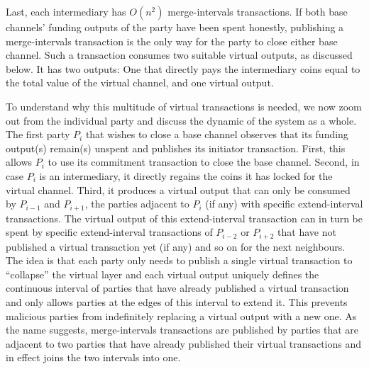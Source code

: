   Last, each intermediary has $O(n^2)$ merge-intervals transactions. If both
  base channels' funding outputs of the party have been spent honestly, publishing a merge-intervals
  transaction is the only way for the party to close either base channel. Such a
  transaction consumes two suitable virtual outputs, as discussed below. It has
  two outputs: One that directly pays the intermediary coins equal to the total
  value of the virtual channel, and one virtual output.

  To understand why this multitude of virtual transactions is needed, we now
  zoom out from the individual party and discuss the dynamic of the system as a
  whole. The first party $P_i$ that wishes to close a base channel observes that
  its funding output(s) remain(s) unspent and publishes its initiator
  transaction. First, this allows $P_i$ to use its commitment transaction to
  close the base channel. Second, in case $P_i$ is an intermediary, it directly
  regains the coins it has locked for the virtual channel. Third, it produces a
  virtual output that can only be consumed by $P_{i-1}$ and $P_{i+1}$, the
  parties adjacent to $P_i$ (if any) with specific extend-interval transactions.
  The virtual output of this extend-interval transaction can in turn be spent by
  specific extend-interval transactions of $P_{i-2}$ or $P_{i+2}$ that have not
  published a virtual transaction yet (if any) and so on for the next neighbours. The
  idea is that each party only needs to publish a single virtual transaction to
  ``collapse'' the virtual layer and each virtual output uniquely defines the
  continuous interval of parties that have already published a virtual
  transaction and only allows parties at the edges of this interval to extend it.
  This prevents malicious parties from indefinitely replacing a virtual output
  with a new one. As the name suggests, merge-intervals transactions are
  published by parties that are adjacent to two parties that have already
  published their virtual transactions and in effect joins the two intervals into
  one.

